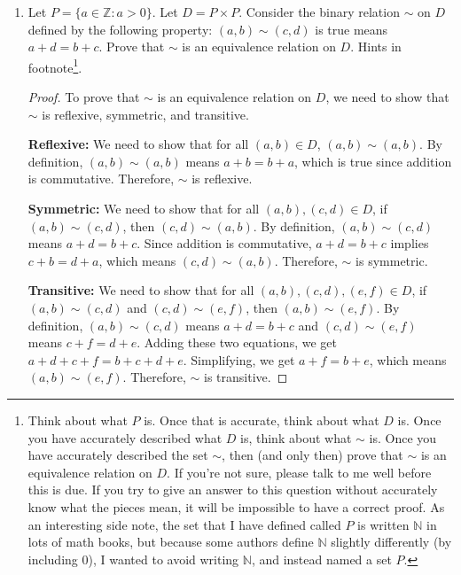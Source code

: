 \documentclass{article}
\newcommand\Z{\mathbb{Z}}
\begin{document}
\begin{enumerate}

    \item Let $P = \{a \in \Z : a > 0\}$. Let $D = P \times P$. Consider the binary
          relation $\sim$ on $D$ defined by the following property: $(a,b) \sim (c,d)$ is
          true means $a+d=b+c$. Prove that $\sim$ is an equivalence relation on $D$.
          Hints in footnote\footnote{Think about what $P$ is. Once that is accurate,
              think about what $D$ is. Once you have accurately described what $D$ is, think
              about what $\sim$ is. Once you have accurately described the set $\sim$, then
              (and only then) prove that $\sim$ is an equivalence relation on $D$. If you're
              not sure, please talk to me well before this is due. If you try to give an
              answer to this question without accurately know what the pieces mean, it will
              be impossible to have a correct proof. As an interesting side note, the set
              that I have defined called $P$ is written $\mathbb{N}$ in lots of math books,
              but because some authors define $\mathbb{N}$ slightly differently (by including
              $0$), I wanted to avoid writing $\mathbb{N}$, and instead named a set $P$.}.

          \begin{proof}
              To prove that $\sim$ is an equivalence relation on $D$, we need to show that $\sim$ is reflexive, symmetric, and transitive.

              \textbf{Reflexive:} We need to show that for all $(a,b) \in D$, $(a,b) \sim (a,b)$. By definition, $(a,b) \sim (a,b)$ means $a+b = b+a$, which is true since addition is commutative. Therefore, $\sim$ is reflexive.

              \textbf{Symmetric:} We need to show that for all $(a,b), (c,d) \in D$, if $(a,b) \sim (c,d)$, then $(c,d) \sim (a,b)$. By definition, $(a,b) \sim (c,d)$ means $a+d = b+c$. Since addition is commutative, $a+d = b+c$ implies $c+b = d+a$, which means $(c,d) \sim (a,b)$. Therefore, $\sim$ is symmetric.

              \textbf{Transitive:} We need to show that for all $(a,b), (c,d), (e,f) \in D$, if $(a,b) \sim (c,d)$ and $(c,d) \sim (e,f)$, then $(a,b) \sim (e,f)$. By definition, $(a,b) \sim (c,d)$ means $a+d = b+c$ and $(c,d) \sim (e,f)$ means $c+f = d+e$. Adding these two equations, we get $a+d + c+f = b+c + d+e$. Simplifying, we get $a+f = b+e$, which means $(a,b) \sim (e,f)$. Therefore, $\sim$ is transitive.


\end{proof}
\end{enumerate}
\end{document}
